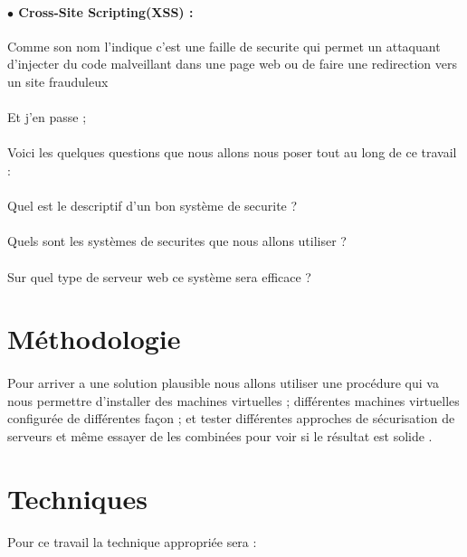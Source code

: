    \paragraph{$\bullet$ Cross-Site Scripting(XSS) :} Comme son nom l'indique c'est une faille de securite qui permet un attaquant d'injecter du code malveillant dans une page web ou de faire une redirection vers un site frauduleux 
   \paragraph{ }
   Et j'en passe ;
   \pagebreak
   \paragraph{ }
   Voici les  quelques questions que nous allons nous poser tout au long de ce travail :
   \paragraph{ }
   \textendash \space Quel est le descriptif d'un bon système de securite ?
   \paragraph{ }
   \textendash \space Quels sont les systèmes de securites  que nous allons utiliser ?
   \paragraph{ }
   \textendash \space Sur quel type de serveur web ce système sera efficace ?
   \section{Méthodologie}
   \paragraph{ }
   Pour arriver a une solution plausible  nous allons utiliser une procédure  qui va nous permettre d'installer des machines virtuelles ; différentes machines virtuelles configurée de différentes façon  ;  et tester différentes approches de sécurisation de serveurs et même essayer de les combinées pour voir si le résultat est solide .
  \section{ Techniques }
  \paragraph{ }
  Pour ce travail la technique appropriée sera :
